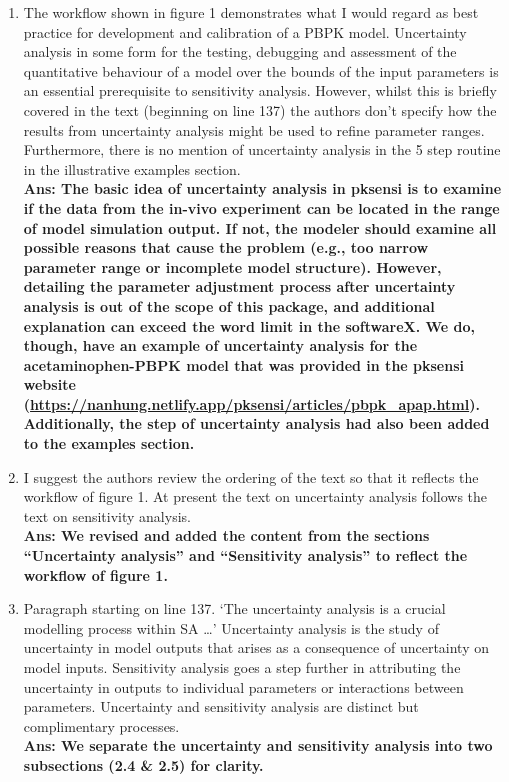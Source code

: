 \documentclass[
]{article}
\begin{document}
\begin{enumerate}
\def\labelenumi{\arabic{enumi}.}
\item
  The workflow shown in figure 1 demonstrates what I would regard as
  best practice for development and calibration of a PBPK model.
  Uncertainty analysis in some form for the testing, debugging and
  assessment of the quantitative behaviour of a model over the bounds of
  the input parameters is an essential prerequisite to sensitivity
  analysis. However, whilst this is briefly covered in the text
  (beginning on line 137) the authors don't specify how the results from
  uncertainty analysis might be used to refine parameter ranges.
  Furthermore, there is no mention of uncertainty analysis in the 5 step
  routine in the illustrative examples section.\\
  \textbf{Ans: The basic idea of uncertainty analysis in pksensi is to
  examine if the data from the in-vivo experiment can be located in the
  range of model simulation output. If not, the modeler should examine
  all possible reasons that cause the problem (e.g., too narrow
  parameter range or incomplete model structure). However, detailing the
  parameter adjustment process after uncertainty analysis is out of the
  scope of this package, and additional explanation can exceed the word
  limit in the softwareX. We do, though, have an example of uncertainty
  analysis for the acetaminophen-PBPK model that was provided in the
  pksensi website
  (\url{https://nanhung.netlify.app/pksensi/articles/pbpk_apap.html}).
  Additionally, the step of uncertainty analysis had also been added to
  the examples section.}
\item
  I suggest the authors review the ordering of the text so that it
  reflects the workflow of figure 1. At present the text on uncertainty
  analysis follows the text on sensitivity analysis.\\
  \textbf{Ans: We revised and added the content from the sections
  ``Uncertainty analysis'' and ``Sensitivity analysis'' to reflect the
  workflow of figure 1.}
\item
  Paragraph starting on line 137. `The uncertainty analysis is a crucial
  modelling process within SA \ldots{}' Uncertainty analysis is the
  study of uncertainty in model outputs that arises as a consequence of
  uncertainty on model inputs. Sensitivity analysis goes a step further
  in attributing the uncertainty in outputs to individual parameters or
  interactions between parameters. Uncertainty and sensitivity analysis
  are distinct but complimentary processes.\\
  \textbf{Ans: We separate the uncertainty and sensitivity analysis into
  two subsections (2.4 \& 2.5) for clarity.}
\end{enumerate}
\end{document}
